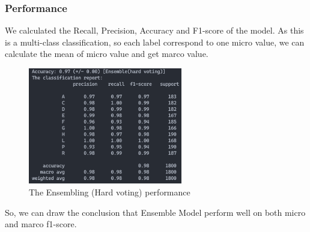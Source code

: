 \documentclass[11pt,en,cite=authoryear]{elegantpaper}
\begin{document}
\subsubsection*{Performance}
We calculated the Recall, Precision, Accuracy and F1-score of the model. As this is a multi-class classification, so each label correspond to one micro value, we can calculate the mean of micro value and get marco value.
\begin{figure}[H]
	\centering
	\includegraphics[width=0.6\textwidth]{image/hvpf}
	\caption{The Ensembling (Hard voting) performance}
	\label{hvpf}
\end{figure}
So, we can draw the conclusion that Ensemble Model perform well on both micro and marco f1-score.

\end{document}

